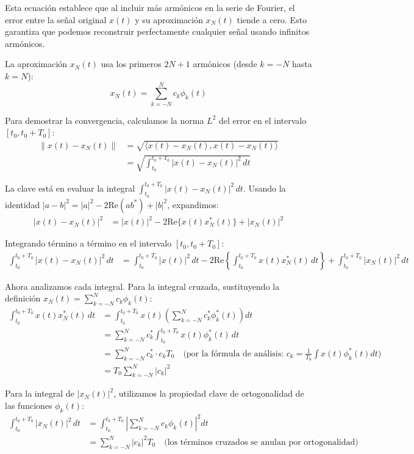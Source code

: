 \documentclass[
  11pt,
  letterpaper,
   addpoints,
   answers
  ]{exam}
\begin{document}
\begin{questions}
\begin{solution}
Esta ecuación establece que al incluir más armónicos en la serie de Fourier, el error entre la señal original \(x(t)\) y su aproximación \(x_N(t)\) tiende a cero. Esto garantiza que podemos reconstruir perfectamente cualquier señal usando infinitos armónicos.

La aproximación \(x_N(t)\) usa los primeros \(2N+1\) armónicos (desde \(k=-N\) hasta \(k=N\)):
\begin{equation}
x_N(t) = \sum_{k=-N}^{N} c_k \phi_k(t)
\end{equation}

Para demostrar la convergencia, calculamos la norma \(L^2\) del error en el intervalo \([t_0, t_0+T_0]\):
\begin{align}
\| x(t) - x_N(t) \| &= \sqrt{\langle x(t) - x_N(t), x(t) - x_N(t) \rangle} \\
&= \sqrt{\int_{t_0}^{t_0+T_0} |x(t) - x_N(t)|^2 \, dt}
\end{align}

La clave está en evaluar la integral \(\int_{t_0}^{t_0+T_0} |x(t) - x_N(t)|^2 \, dt\). Usando la identidad \(|a-b|^2 = |a|^2 - 2\text{Re}(ab^*) + |b|^2\), expandimos:
\begin{align}
|x(t) - x_N(t)|^2 &= |x(t)|^2 - 2\text{Re}\{x(t)x_N^*(t)\} + |x_N(t)|^2
\end{align}

Integrando término a término en el intervalo \([t_0, t_0+T_0]\):
\begin{align}
\int_{t_0}^{t_0+T_0} |x(t) - x_N(t)|^2 \, dt &= \int_{t_0}^{t_0+T_0} |x(t)|^2 \, dt - 2\text{Re}\left\{\int_{t_0}^{t_0+T_0} x(t)x_N^*(t) \, dt\right\} + \int_{t_0}^{t_0+T_0} |x_N(t)|^2 \, dt
\end{align}

Ahora analizamos cada integral. Para la integral cruzada, sustituyendo la definición \(x_N(t) = \sum_{k=-N}^{N} c_k \phi_k(t)\):
\begin{align}
\int_{t_0}^{t_0+T_0} x(t)x_N^*(t) \, dt &= \int_{t_0}^{t_0+T_0} x(t) \left( \sum_{k=-N}^{N} c_k^* \phi_k^*(t) \right) dt \\
&= \sum_{k=-N}^{N} c_k^* \int_{t_0}^{t_0+T_0} x(t) \phi_k^*(t) \, dt \\
&= \sum_{k=-N}^{N} c_k^* \cdot c_k T_0 \quad \text{(por la fórmula de análisis: } c_k = \frac{1}{T_0}\int x(t)\phi_k^*(t)dt\text{)} \\
&= T_0 \sum_{k=-N}^{N} |c_k|^2
\end{align}

Para la integral de \(|x_N(t)|^2\), utilizamos la propiedad clave de ortogonalidad de las funciones \(\phi_k(t)\):
\begin{align}
\int_{t_0}^{t_0+T_0} |x_N(t)|^2 \, dt &= \int_{t_0}^{t_0+T_0} \left| \sum_{k=-N}^{N} c_k \phi_k(t) \right|^2 dt \\
&= \sum_{k=-N}^{N} |c_k|^2 T_0 \quad \text{(los términos cruzados se anulan por ortogonalidad)}
\end{align}


\end{solution}
\end{questions}
\end{document}
